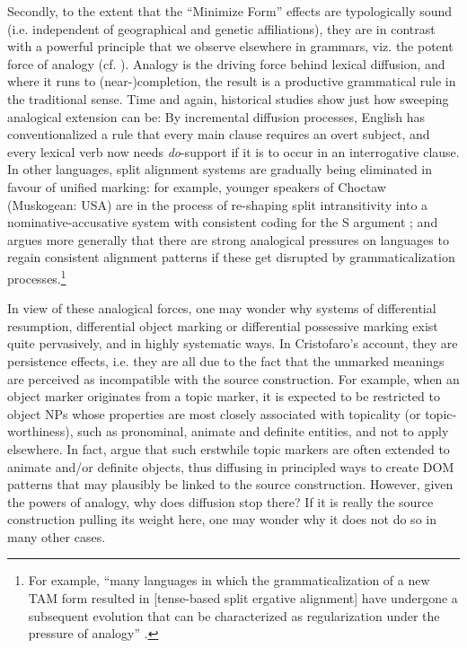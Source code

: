 \documentclass[output=paper]{langsci/langscibook}
\begin{document}
Secondly, to the extent that the “Minimize Form” effects are typologically sound (i.e. independent of geographical and genetic affiliations), they are in contrast with a powerful principle that we observe elsewhere in grammars, viz. the potent force of analogy (cf. \citealt{GentnerSmith2012,BlevinsBlevins2009}). Analogy is the driving force behind lexical diffusion, and where it runs to (near-)completion, the result is a productive grammatical rule in the traditional sense. Time and again, historical studies show just how sweeping analogical extension can be: By incremental diffusion processes, English has conventionalized a rule that every main clause requires an overt subject, and every lexical verb now needs \textit{do}{}-support if it is to occur in an interrogative clause. In other languages, split alignment systems are gradually being eliminated in favour of unified marking: for example, younger speakers of Choctaw (Muskogean: USA) are in the process of re-shaping split intransitivity into a nominative-accusative system with consistent coding for the S argument \citep[140]{Broadwell2006}; and \citet{Creissels2018} argues more generally that there are strong analogical pressures on languages to regain consistent alignment patterns if these get disrupted by grammaticalization processes.\footnote{For example, “many languages in which the grammaticalization of a new TAM form resulted in [tense-based split ergative alignment] have undergone a subsequent evolution that can be characterized as regularization under the pressure of analogy” \citep[81]{Creissels2018}.} 

In view of these analogical forces, one may wonder why systems of differential resumption, differential object marking or differential possessive marking exist quite pervasively, and in highly systematic ways. In Cristofaro’s account, they are persistence effects, i.e. they are all due to the fact that the unmarked meanings are perceived as incompatible with the source construction. For example, when an object marker originates from a topic marker, it is expected to be restricted to object NPs whose properties are most closely associated with topicality (or topic-worthiness), such as pronominal, animate and definite entities, and not to apply elsewhere. In fact, \citet{DalrympleNikolaeva2011} argue that such erstwhile topic markers are often extended to animate and/or definite objects, thus diffusing in principled ways to create DOM patterns that may plausibly be linked to the source construction. However, given the powers of analogy, why does diffusion stop there? If it is really the source construction pulling its weight here, one may wonder why it does not do so in many other cases. 
\end{document}

